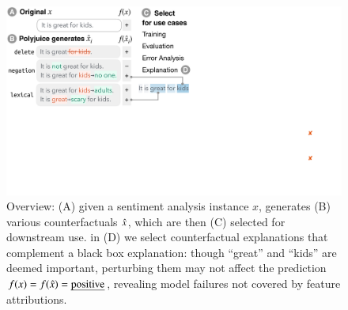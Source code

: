 
\begin{figure}[t]
\centering
\includegraphics[trim={0 18cm 30.5cm 0cm},clip, width=1\columnwidth]{figures/teaser.pdf}
\vspace{-15pt}
\caption{
Overview: (A) given a sentiment analysis instance $x$, \sysname generates (B) various counterfactuals $\hat{x}$, which are then (C) selected for downstream use.
\eg in (D) we select counterfactual explanations that complement a black box explanation: though ``great'' and ``kids'' are deemed important, perturbing them may not affect the prediction $f(x)=f(\hat{x})=\text{\emph{positive}}$, revealing model failures not covered by feature attributions.\footnotemark
}
\vspace{-10pt}
\label{fig:teaser}
\end{figure} 


